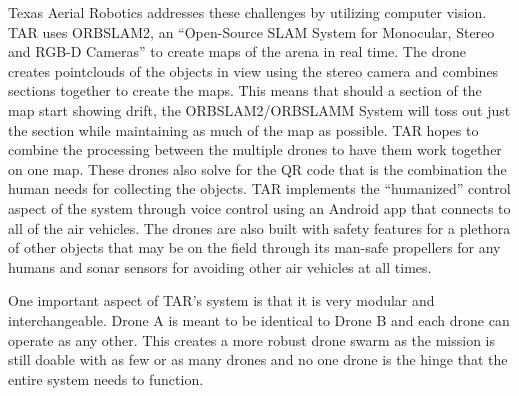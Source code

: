\documentclass[12pt,letterpaper]{article}
\begin{document}
	Texas Aerial Robotics addresses these challenges by utilizing computer vision. TAR uses ORBSLAM2, an ``Open-Source SLAM System for Monocular, Stereo and RGB-D Cameras'' to create maps of the arena in real time. The drone creates pointclouds of the objects in view using the stereo camera and combines sections together to create the maps. This means that should a section of the map start showing drift, the ORBSLAM2/ORBSLAMM System will toss out just the section while maintaining as much of the map as possible. TAR hopes to combine the processing between the multiple drones to have them work together on one map. These drones also solve for the QR code that is the combination the human needs for collecting the objects. TAR implements the ``humanized'' control aspect of the system through voice control using an Android app that connects to all of the air vehicles. The drones are also built with safety features for a plethora of other objects that may be on the field through its man-safe propellers for any humans and sonar sensors for avoiding other air vehicles at all times.

	One important aspect of TAR’s system is that it is very modular and interchangeable. Drone A is meant to be identical to Drone B and each drone can operate as any other. This creates a more robust drone swarm as the mission is still doable with as few or as many drones and no one drone is the hinge that the entire system needs to function. 
\end{document}
